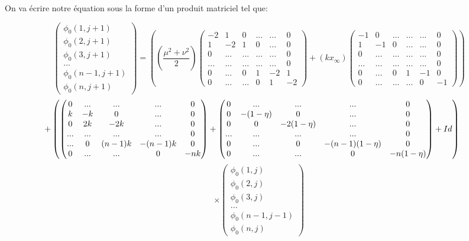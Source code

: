 \documentclass[a4paper,oneside,11pt]{article}
\begin{document}
On va écrire notre équation sous la forme d'un produit matriciel tel que:

$$\begin{pmatrix} 
\phi_{0}(1,j+1) \\
\phi_{0}(2,j+1) \\
\phi_{0}(3,j+1) \\
... \\
\phi_{0}(n-1,j+1) \\
\phi_{0}(n,j+1)
\end{pmatrix}
=\left((\frac{\mu^{2}+\nu^{2}}{2})
\begin{pmatrix} 
-2 & 1 & 0 & ... & ... & 0 \\
1 & -2 & 1  & 0 & ... & 0\\
0 & ... & ... & ... & ... & 0\\
... & ... & ... & ... & ... & 0 \\
 0 & ... & 0 & 1 & -2 & 1 \\
 0 & ... & ... & 0 & 1 & -2 
\end{pmatrix}
+(kx_{\infty})
\begin{pmatrix} 
-1 & 0 & ... & ... & ... & 0 \\
1 & -1 & 0  & ... & ... & 0\\
0 & ... & ... & ... & ... & 0\\
... & ... & ... & ... & ... & 0 \\
 0 & ... & 0 & 1 & -1 & 0 \\
 0 & ... & ... & ... & 0 & -1 
\end{pmatrix}
\right)
$$
$$
\hspace*{-0.05\textwidth}
+\left(\begin{pmatrix} 
0 & ... & ...  & ... & 0 \\
k & -k & 0   & ... & 0\\
0 & 2k & -2k  & ... & 0\\
... & ... & ...  & ... & 0 \\
 ... &  0 & (n-1)k & -(n-1)k & 0 \\
 0 & ...  & ... & 0 & -nk 
\end{pmatrix}
+\begin{pmatrix} 
0 & ... & ... & ...  & 0 \\
0 & -(1-\eta) & 0  & ... & 0\\
0 & 0 & -2(1-\eta) & ... & 0\\
... & ... & ...  & ... & 0 \\
 0 & ...  & 0 & -(n-1)(1-\eta) & 0 \\
 0 & ... & ... & 0 & -n(1-\eta)
\end{pmatrix}
+Id\right)
$$
$$
\times
\begin{pmatrix} 
\phi_{0}(1,j) \\
\phi_{0}(2,j) \\
\phi_{0}(3,j) \\
... \\
\phi_{0}(n-1,j-1) \\
\phi_{0}(n,j)
\end{pmatrix}
$$
\end{document}
